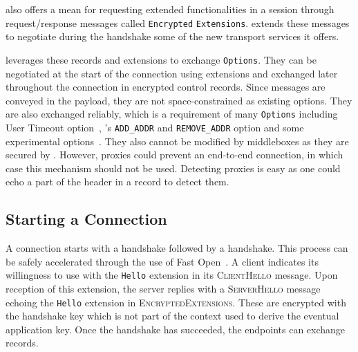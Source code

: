\tls also offers a mean for requesting extended functionalities in a \tls
session through request/response messages called \tls \texttt{Encrypted}
\texttt{Extensions}.
\tcpls extends these messages to negotiate during the handshake some of the new
transport services it offers.

\tcpls leverages these records and extensions to exchange \tcp \texttt{Options}. They can be negotiated at the start of the connection using \tls extensions and exchanged later throughout the connection in \tcpls encrypted control records. Since \tls messages are conveyed in the \tcp payload, they are not space-constrained as existing \tcp options.
They are also exchanged reliably, which is a requirement of many \tcp \texttt{Options} including \tcp User Timeout option~\cite{rfc5482}, \mptcp's \texttt{ADD\_ADDR} and \texttt{REMOVE\_ADDR} option and some experimental \tcp options~\cite{rfc6994}. They also cannot be modified by middleboxes as they are secured by \tls. However, \tcp proxies could prevent an end-to-end \tcp connection, in which case this mechanism should not be used. Detecting \tcp proxies is easy as one could echo a part of the \tcp header in a \tcpls record to detect them.



\subsection{Starting a \tcpls Connection}\label{design.start}

A \tcpls connection starts with a \tcp handshake followed by a \tls handshake.
This process can be safely accelerated through the use of \tcp Fast Open~\cite{rfc7413}.
A \tcpls client
indicates its willingness to use \tcpls with the \tcpls \texttt{Hello} extension
in its \tls \textsc{ClientHello} message. Upon reception of this extension, the \tcpls server replies with a \tls \textsc{ServerHello} message echoing the \tcpls \texttt{Hello} extension in \tls \textsc{EncryptedExtensions}.
These are encrypted with the handshake key which is not part of the context used to derive the eventual application key.
Once the \tls handshake has succeeded, the endpoints can exchange \tcpls
records.

